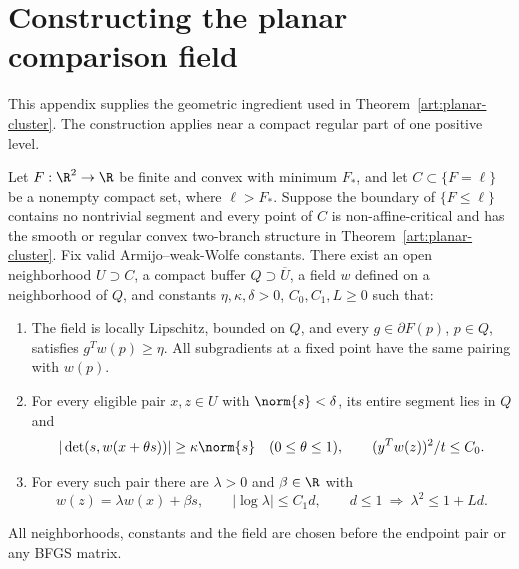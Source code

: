 \section{Constructing the planar comparison field}\label{art:planar-appendix}

This appendix supplies the geometric ingredient used in
Theorem~\ref{art:planar-cluster}. The construction applies near a compact
regular part of one positive level.

\begin{lemma}\label{art:planar-field}
Let $F:\R^2\to\R$ be finite and convex with minimum $F_*$, and let
$C\subset\{F=\ell\}$ be a nonempty compact set, where $\ell>F_*$.
Suppose the boundary of $\{F\le\ell\}$ contains no nontrivial segment and
every point of $C$ is non-affine-critical and has the smooth or regular
convex two-branch structure in Theorem~\ref{art:planar-cluster}.
Fix valid Armijo--weak-Wolfe constants. There exist an open neighborhood
$U\supset C$, a compact buffer $Q\supset\overline U$, a field $w$ defined
on a neighborhood of $Q$, and constants
$\eta,\kappa,\delta>0$, $C_0,C_1,L\ge0$ such that:

\begin{enumerate}
\item The field is locally Lipschitz, bounded on $Q$, and every
$g\in\partial F(p)$, $p\in Q$, satisfies $g^Tw(p)\ge\eta$.
All subgradients at a fixed point have the same pairing with $w(p)$.
\item For every eligible pair $x,z\in U$ with $\norm{s}<\delta$, its entire
segment lies in $Q$ and
\[
 |\det(s,w(x+\theta s))|\ge\kappa\norm{s}
 \quad(0\le\theta\le1),\qquad (y^Tw(z))^2/t\le C_0.
\]
\item For every such pair there are $\lambda>0$ and $\beta\in\R$ with
\[
 w(z)=\lambda w(x)+\beta s,\qquad
 |\log\lambda|\le C_1d,
 \qquad d\le1\ \Longrightarrow\ \lambda^2\le1+Ld.
\]
\end{enumerate}
All neighborhoods, constants and the field are chosen before the endpoint
pair or any BFGS matrix.
\end{lemma}
